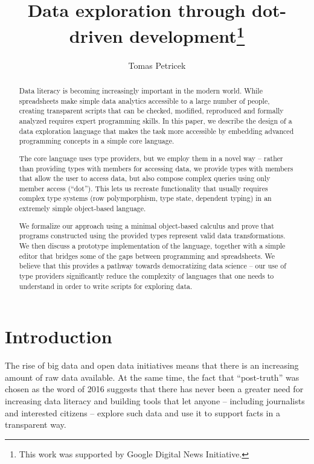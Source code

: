 \documentclass[a4paper,UKenglish]{lipics-v2016}
\title{Data exploration through dot-driven development\footnote{This 
  work was supported by Google Digital News Initiative.}}
\author[1]{Tomas Petricek}
\affil[1]{The Alan Turing Institute, London, UK\\
  \texttt{tomas@tomasp.net}}
\theoremstyle{plain}
\theoremstyle{definition}
\begin{document}
\maketitle

\begin{abstract}
Data literacy is becoming increasingly important in the modern world. While spreadsheets make 
simple data analytics accessible to a large number of people, creating transparent scripts that 
can be checked, modified, reproduced and formally analyzed requires expert programming skills. 
In this paper, we describe the design of a data exploration language that makes the task more 
accessible by embedding advanced programming concepts in a simple core language.

The core language uses type providers, but we employ them in a novel way -- rather than providing 
types with members for accessing data, we provide types with members that allow the user to access 
data, but also compose complex queries using only member access (``dot''). This lets us recreate 
functionality that usually requires complex type systems (row polymporphism, type state, 
dependent typing) in an extremely simple object-based language.

We formalize our approach using a minimal object-based calculus and prove that
programs constructed using the provided types represent valid data transformations. We then discuss 
a prototype implementation of the language, together with a simple editor that bridges
some of the gaps between programming and spreadsheets. We believe that this provides a pathway towards
democratizing data science -- our use of type providers significantly reduce the complexity of 
languages that one needs to understand in order to write scripts for exploring data.
\end{abstract}


\section{Introduction}
\label{sec:intro}

The rise of big data and open data initiatives means that there is an increasing amount of raw data 
available. At the same time, the fact that ``post-truth'' was chosen as the word of 2016 suggests 
that there has never been a greater need for increasing data literacy and building tools that let 
anyone -- including journalists and interested citizens -- explore such data and use it to support 
facts in a transparent way.
\end{document}
